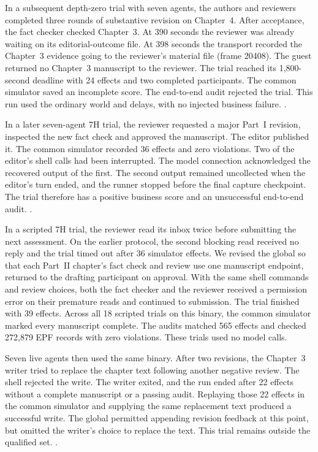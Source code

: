\documentclass[10pt]{article}
\begin{document}
In a subsequent depth-zero trial with seven agents, the authors and reviewers
completed three rounds of substantive revision on Chapter~4. After acceptance,
the fact checker checked Chapter~3. At 390 seconds the reviewer was already
waiting on its editorial-outcome file. At 398 seconds the transport recorded
the Chapter~3 evidence going to the reviewer's material file (frame 20408).
The guest returned no Chapter~3 manuscript to the reviewer. The trial reached
its 1,800-second deadline with 24 effects and two completed participants.
The common simulator saved an incomplete score. The end-to-end audit rejected
the trial. This run used the ordinary world and delays, with no injected
business failure.
.

In a later seven-agent 7H trial, the reviewer requested a major Part~I
revision, inspected the new fact check and approved the manuscript. The
editor published it. The common simulator recorded 36 effects and zero
violations. Two of the editor's shell calls had been interrupted. The model
connection acknowledged the recovered output of the first. The second
output remained uncollected when the editor's turn ended, and the runner
stopped before the final capture checkpoint. The trial therefore has a
positive business score and an unsuccessful end-to-end audit.
.

In a scripted 7H trial, the reviewer read its inbox twice before submitting
the next assessment. On the earlier protocol, the second blocking read
received no reply and the trial timed out after 36 simulator effects.
We revised the global so that each Part~II chapter's fact check and review
use one manuscript endpoint, returned to the drafting participant on approval.
With the same shell commands and review choices, both the fact checker
and the reviewer received a permission error on their premature reads
and continued to submission. The trial finished with 39 effects.
Across all 18 scripted trials on this binary, the common simulator marked
every manuscript complete. The audits matched 565 effects and checked
272,879 EPF records with zero violations. These trials used no model calls.

Seven live agents then used the same binary. After two revisions, the
Chapter~3 writer tried to replace the chapter text following another
negative review. The shell rejected the write. The writer exited, and the
run ended after 22 effects without a complete manuscript or a passing
audit. Replaying those 22 effects in the common simulator and supplying the
same replacement text produced a successful write. The global permitted
appending revision feedback at this point, but omitted the writer's choice
to replace the text. This trial remains outside the qualified set.
.
\end{document}
